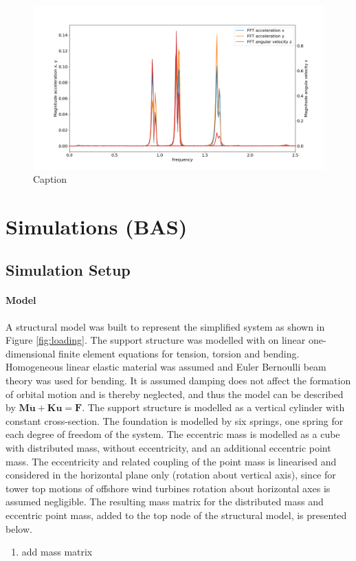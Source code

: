 \documentclass{article}
\begin{document}
\begin{figure}
    \centering
    \includegraphics[width=0.5\linewidth]{results/experiment/spectrum.png}
    \caption{Caption}
    \label{fig:spectrum}
\end{figure}

\clearpage

\section{Simulations (BAS)}
\label{sec:simulations}

\subsection{Simulation Setup}

\paragraph{Model}
A structural model was built to represent the simplified system as shown in Figure \ref{fig:loading}. The support structure was modelled with on linear one-dimensional finite element equations for tension, torsion and bending. Homogeneous linear elastic material was assumed and Euler Bernoulli beam theory was used for bending. It is assumed damping does not affect the formation of orbital motion and is thereby neglected, and thus the model can be described by \( \mathbf{M}\ddot{\mathbf{u}}+\mathbf{K}\mathbf{u} = \mathbf{F} \).
The support structure is modelled as a vertical cylinder with constant cross-section. The foundation is modelled by six springs, one spring for each degree of freedom of the system. The eccentric mass is modelled as a cube with distributed mass, without eccentricity, and an additional eccentric point mass. The eccentricity and related coupling of the point mass is linearised and considered in the horizontal plane only (rotation about vertical axis), since for tower top motions of offshore wind turbines rotation about horizontal axes is assumed negligible. The resulting mass matrix for the distributed mass and eccentric point mass, added to the top node of the structural model, is presented below.
\begin{enumerate}
    \item add mass matrix
\end{enumerate}
\end{document}
